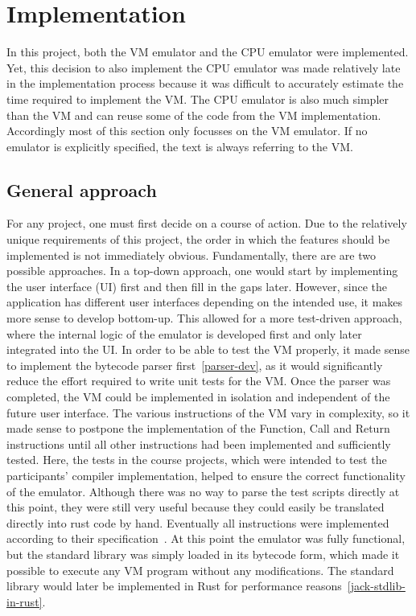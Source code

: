\section{Implementation} \label{implementation}
In this project, both the VM emulator and the CPU emulator were implemented. Yet, this decision to also implement the CPU emulator was made relatively late in the implementation process because it was difficult to accurately estimate the time required to implement the VM.
The CPU emulator is also much simpler than the VM and can reuse some of the code from the VM implementation.
Accordingly most of this section only focusses on the VM emulator. If no emulator is explicitly specified, the text is always referring to the VM.

\subsection{General approach}
For any project, one must first decide on a course of action. Due to the relatively unique requirements of this project, the order in which the features should be implemented is not immediately obvious.
Fundamentally, there are are two possible approaches. In a top-down approach, one would start by implementing the user interface (UI) first and then fill in the gaps later.
However, since the application has different user interfaces depending on the intended use, it makes more sense to develop bottom-up.
This allowed for a more test-driven approach, where the internal logic of the emulator is developed first and only later integrated into the UI.
In order to be able to test the VM properly, it made sense to implement the bytecode parser first~\ref{parser-dev}, as it would significantly reduce the effort required to write unit tests for the VM.
Once the parser was completed, the VM could be implemented in isolation and independent of the future user interface. The various instructions of the VM vary in complexity, so it made sense to postpone the implementation of the Function, Call and Return instructions until all other instructions had been implemented and sufficiently tested.
Here, the tests in the course projects, which were intended to test the participants' compiler implementation, helped to ensure the correct functionality of the emulator.
Although there was no way to parse the test scripts directly at this point, they were still very useful because they could easily be translated directly into rust code by hand.
Eventually all instructions were implemented according to their specification~\cite{nisan2005}.
At this point the emulator was fully functional, but the standard library was simply loaded in its bytecode form, which made it possible to execute any VM program without any modifications. The standard library would later be implemented in Rust for performance reasons~\ref{jack-stdlib-in-rust}.

